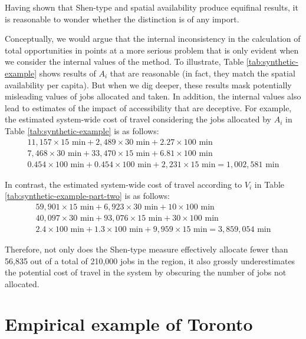 \documentclass[]{elsarticle} %
\begin{document}
Having shown that Shen-type and spatial availability produce equifinal
results, it is reasonable to wonder whether the distinction is of any
import.

Conceptually, we would argue that the internal inconsistency in the
calculation of total opportunities in \citet{shen1998} points at a more
serious problem that is only evident when we consider the internal
values of the method. To illustrate, Table \ref{tab:synthetic-example}
shows results of \(A_i\) that are reasonable (in fact, they match the
spatial availability per capita). But when we dig deeper, these results
mask potentially misleading values of jobs allocated and taken. In
addition, the internal values also lead to estimates of the impact of
accessibility that are deceptive. For example, the estimated system-wide
cost of travel considering the jobs allocated by \(A_i\) in Table
\ref{tab:synthetic-example} is as follows: \[
\begin{array}{l}
11,157\times 15 \text{ min} + 2,489\times 30 \text{ min} + 2.27\times 100 \text{ min}\\
7,468\times 30 \text{ min} + 33,470\times 15 \text{ min} + 6.81\times 100 \text{ min}\\
0.454\times 100 \text{ min} + 0.454\times 100 \text{ min} + 2,231\times 15 \text{ min} = 1,002,581\text{ min}
\end{array}
\]

In contrast, the estimated system-wide cost of travel according to
\(V_i\) in Table \ref{tab:synthetic-example-part-two} is as follows: \[
\begin{array}{l}
59,901\times 15 \text{ min} + 6,923\times 30 \text{ min} + 10\times 100 \text{ min}\\
40,097\times 30 \text{ min} + 93,076\times 15 \text{ min} + 30\times 100 \text{ min}\\
2.4\times 100 \text{ min} + 1.3\times 100 \text{ min} + 9,959\times 15 \text{ min} = 3,859,054\text{ min}
\end{array}
\]

Therefore, not only does the Shen-type measure effectively allocate
fewer than 56,835 out of a total of 210,000 jobs in the region, it also
grossly underestimates the potential cost of travel in the system by
obscuring the number of jobs not allocated.

\hypertarget{empirical-example-of-toronto}{%
\section{Empirical example of
Toronto}\label{empirical-example-of-toronto}}
\end{document}
